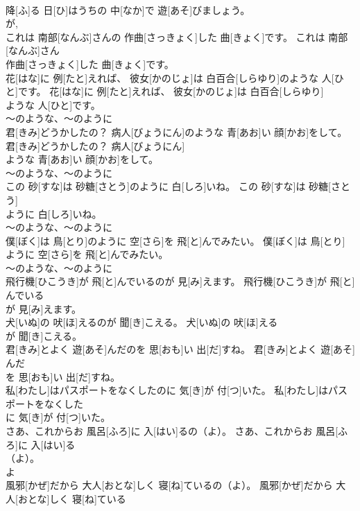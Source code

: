 \documentclass[8pt]{extreport}
\begin{document}
\begin{CJK}{UTF8}{min}
\\	降[ふ]る 日[ひ]はうちの 中[なか]で 遊[あそ]びましょう。	
\\	が, 
\\	これは 南部[なんぶ]さんの 作曲[さっきょく]した 曲[きょく]です。	これは 南部[なんぶ]さん
\\	作曲[さっきょく]した 曲[きょく]です。	
\\	花[はな]に 例[たと]えれば、 彼女[かのじょ]は 白百合[しらゆり]のような 人[ひと]です。	花[はな]に 例[たと]えれば、 彼女[かのじょ]は 白百合[しらゆり]
\\	ような 人[ひと]です。	
\\	～のような、～のように
\\	君[きみ]どうかしたの？ 病人[びょうにん]のような 青[あお]い 顔[かお]をして。	君[きみ]どうかしたの？ 病人[びょうにん]
\\	ような 青[あお]い 顔[かお]をして。	
\\	～のような、～のように
\\	この 砂[すな]は 砂糖[さとう]のように 白[しろ]いね。	この 砂[すな]は 砂糖[さとう]
\\	ように 白[しろ]いね。	
\\	～のような、～のように
\\	僕[ぼく]は 鳥[とり]のように 空[さら]を 飛[と]んでみたい。	僕[ぼく]は 鳥[とり]
\\	ように 空[さら]を 飛[と]んでみたい。	
\\	～のような、～のように
\\	飛行機[ひこうき]が 飛[と]んでいるのが 見[み]えます。	飛行機[ひこうき]が 飛[と]んでいる
\\	が 見[み]えます。	
\\	犬[いぬ]の 吠[ほ]えるのが 聞[き]こえる。	犬[いぬ]の 吠[ほ]える
\\	が 聞[き]こえる。	
\\	君[きみ]とよく 遊[あそ]んだのを 思[おも]い 出[だ]すね。	君[きみ]とよく 遊[あそ]んだ
\\	を 思[おも]い 出[だ]すね。	
\\	私[わたし]はパスポートをなくしたのに 気[き]が 付[つ]いた。	私[わたし]はパスポートをなくした
\\	に 気[き]が 付[つ]いた。	
\\	さあ、これからお 風呂[ふろ]に 入[はい]るの（よ）。	さあ、これからお 風呂[ふろ]に 入[はい]る
\\	（よ）。	
\\	よ 
\\	風邪[かぜ]だから 大人[おとな]しく 寝[ね]ているの（よ）。	風邪[かぜ]だから 大人[おとな]しく 寝[ね]ている

\end{CJK}
\end{document}
